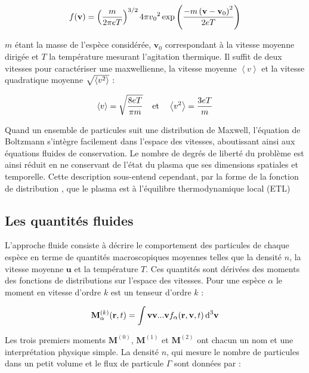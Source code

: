 \begin{refsection}
\begin{equation}
\label{1-MaxwellDistribution}
	f(\mathbf{v})=
	\left(\frac{m}{2\pi
	eT}\right)^{{3/2}}4\pi v{_{0}}^{{2}}\exp\left(\frac{-m
	\left(\mathbf v-\mathbf v{_{0}}\right)^{{2}}}{2eT}\right)
\end{equation}

$m$ étant la masse de l'espèce considérée, $\mathbf v_0$ correspondant à la
vitesse moyenne dirigée et $T$ la température mesurant l'agitation
thermique. Il suffit de deux vitesses pour caractériser une maxwellienne, la
vitesse moyenne $\left<v\right>$ et la vitesse quadratique moyenne
$\sqrt{\left<v^{{2}}\right>}$ :

\begin{equation}
\label{1-EnergyFluxDensity}
	\left<v\right>=\sqrt{\frac{8eT}{\pi m}} \;\;\;\;\text{et}\;\;\;\; 
	\left<v^{{2}}\right>=\frac{3eT}{m}
\end{equation}

Quand un ensemble de particules suit une distribution
de Maxwell, l'équation de Boltzmann s'intègre facilement dans l'espace des
vitesses, aboutissant ainsi aux équations fluides de conservation. Le nombre de
degrés de liberté du problème est ainsi réduit en ne conservant de l'état du plasma
que ses dimensions spatiales et temporelle.
Cette description sous-entend cependant, par la forme de la fonction de
distribution , que le plasma est à l'équilibre
thermodynamique local (ETL)

\subsection{Les quantités fluides}
L'approche fluide consiste à décrire le comportement des particules de chaque
espèce en terme de quantités macroscopiques moyennes telles que la densité $n$,
la vitesse moyenne $\mathbf u$ et la température $T$. Ces quantités sont dérivées
des moments des fonctions de distributions sur l'espace des vitesses.
Pour une espèce $\alpha$ le moment en vitesse d'ordre $k$ est un tenseur d'ordre
$k$ :

\begin{equation}
\mathbf M^{(k)}_\alpha(\mathbf
r,t)=\int\mathbf{v} \mathbf{v} . . .
\mathbf{v} f_\alpha(\mathbf r,\mathbf v,t)
\,\text{d}^{{3}}\mathbf{v}
\end{equation}

Les trois premiers moments $\mathbf M^{(0)}$, $\mathbf M^{(1)}$ et $\mathbf
M^{(2)}$ ont chacun un nom et une interprétation physique simple. La densité $n$, qui
mesure le nombre de particules dans un petit volume et le flux de particule
$\Gamma$ sont données par :


\end{refsection}
